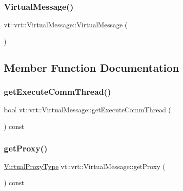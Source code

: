 \subsubsection{\texorpdfstring{Virtual\+Message()}{VirtualMessage()}}
{\footnotesize\ttfamily vt\+::vrt\+::\+Virtual\+Message\+::\+Virtual\+Message (\begin{DoxyParamCaption}{ }\end{DoxyParamCaption})\hspace{0.3cm}{\ttfamily [default]}}



\subsection{Member Function Documentation}
\mbox{\label{structvt_1_1vrt_1_1_virtual_message_a9511339ccb737b655708c9071965dc76}} 
\subsubsection{\texorpdfstring{get\+Execute\+Comm\+Thread()}{getExecuteCommThread()}}
{\footnotesize\ttfamily bool vt\+::vrt\+::\+Virtual\+Message\+::get\+Execute\+Comm\+Thread (\begin{DoxyParamCaption}{ }\end{DoxyParamCaption}) const\hspace{0.3cm}{\ttfamily [inline]}}

\mbox{\label{structvt_1_1vrt_1_1_virtual_message_a37cbc50547e033f049af3c9d289036cc}} 
\subsubsection{\texorpdfstring{get\+Proxy()}{getProxy()}}
{\footnotesize\ttfamily \hyperlink{namespacevt_a1b417dd5d684f045bb58a0ede70045ac}{Virtual\+Proxy\+Type} vt\+::vrt\+::\+Virtual\+Message\+::get\+Proxy (\begin{DoxyParamCaption}{ }\end{DoxyParamCaption}) const\hspace{0.3cm}{\ttfamily [inline]}}

